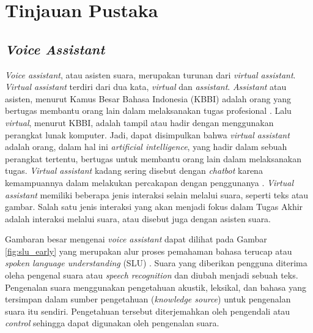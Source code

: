 \chapter{Tinjauan Pustaka}

\section{\textit{Voice Assistant}}

\textit{Voice assistant}, atau asisten suara, merupakan turunan dari \textit{virtual assistant}. \textit{Virtual assistant} terdiri dari dua kata, \textit{virtual} dan \textit{assistant}. \textit{Assistant} atau asisten, menurut Kamus Besar Bahasa Indonesia (KBBI) adalah orang yang bertugas membantu orang lain dalam melaksanakan tugas profesional \parencite{kbbi}. Lalu \textit{virtual}, menurut KBBI, adalah tampil atau hadir dengan menggunakan perangkat lunak komputer. Jadi, dapat disimpulkan bahwa \textit{virtual assistant} adalah orang, dalam hal ini \textit{artificial intelligence}, yang hadir dalam sebuah perangkat tertentu, bertugas untuk membantu orang lain dalam melaksanakan tugas. \textit{Virtual assistant} kadang sering disebut dengan \textit{chatbot} karena kemampuannya dalam melakukan percakapan dengan penggunanya \parencite{tech2005imbot}. \textit{Virtual assistant} memiliki beberapa jenis interaksi selain melalui suara, seperti teks atau gambar. Salah satu jenis interaksi yang akan menjadi fokus dalam Tugas Akhir adalah interaksi melalui suara, atau disebut juga dengan asisten suara.

Gambaran besar mengenai \textit{voice assistant} dapat dilihat pada Gambar \ref{fig:slu_early} yang merupakan alur proses pemahaman bahasa terucap atau \textit{spoken language understanding} (SLU) \parencite{tur2011spoken}. Suara yang diberikan pengguna diterima oleha pengenal suara atau \textit{speech recognition} dan diubah menjadi sebuah teks. Pengenalan suara menggunakan pengetahuan akustik, leksikal, dan bahasa yang tersimpan dalam sumber pengetahuan (\textit{knowledge source}) untuk pengenalan suara itu sendiri. Pengetahuan tersebut diterjemahkan oleh pengendali atau \textit{control} sehingga dapat digunakan oleh pengenalan suara.

